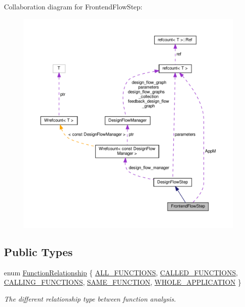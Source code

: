 Collaboration diagram for Frontend\+Flow\+Step\+:
\nopagebreak
\begin{figure}[H]
\begin{center}
\leavevmode
\includegraphics[width=350pt]{d5/de4/classFrontendFlowStep__coll__graph}
\end{center}
\end{figure}
\subsection*{Public Types}
\begin{DoxyCompactItemize}
\item 
enum \hyperlink{classFrontendFlowStep_af7cf30f2023e5b99e637dc2058289ab0}{Function\+Relationship} \{ \newline
\hyperlink{classFrontendFlowStep_af7cf30f2023e5b99e637dc2058289ab0a0108646159d0729d26b31d8dbbbcd96a}{A\+L\+L\+\_\+\+F\+U\+N\+C\+T\+I\+O\+NS}, 
\hyperlink{classFrontendFlowStep_af7cf30f2023e5b99e637dc2058289ab0aa9249dfe7b8c22efbe6f901fe92b0b83}{C\+A\+L\+L\+E\+D\+\_\+\+F\+U\+N\+C\+T\+I\+O\+NS}, 
\hyperlink{classFrontendFlowStep_af7cf30f2023e5b99e637dc2058289ab0a40d703dc8c67965ea0db6e80b2acaf60}{C\+A\+L\+L\+I\+N\+G\+\_\+\+F\+U\+N\+C\+T\+I\+O\+NS}, 
\hyperlink{classFrontendFlowStep_af7cf30f2023e5b99e637dc2058289ab0a0aed8ca6e51a10ae4099bf4832fce2f5}{S\+A\+M\+E\+\_\+\+F\+U\+N\+C\+T\+I\+ON}, 
\newline
\hyperlink{classFrontendFlowStep_af7cf30f2023e5b99e637dc2058289ab0a7842969c0b28d7b45f026ccf8b036e4a}{W\+H\+O\+L\+E\+\_\+\+A\+P\+P\+L\+I\+C\+A\+T\+I\+ON}
 \}\begin{DoxyCompactList}\small\item\em The different relationship type between function analysis. \end{DoxyCompactList}
\end{DoxyCompactItemize}

